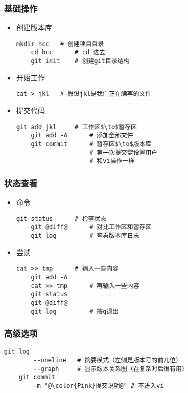 \begin{frame} [fragile]
	\frametitle{基础操作}
	\linespread{1.25}
	\begin{itemize}
	\item 创建版本库
	\begin{lstlisting}[style=bashstyle, gobble=4, texcl]
	mkdir hcc	# 创建项目目录
	cd hcc		# cd 进去
	git init	# 创建git目录结构
	\end{lstlisting}
	\item 开始工作
	\begin{lstlisting}[style=bashstyle, gobble=4, texcl]
	cat > jkl	# 假设jkl是我们正在编写的文件
	\end{lstlisting}
	\item 提交代码
	\begin{lstlisting}[style=bashstyle, gobble=4, texcl]
	git add jkl		# 工作区$\to$暂存区
	git add -A		# 添加全部文件
	git commit		# 暂存区$\to$版本库
					# 第一次提交需设置用户
					# 和vi操作一样
	\end{lstlisting}
	\end{itemize}
\end{frame}

\begin{frame} [fragile]
	\frametitle{状态查看}
	\linespread{1.25}
	\begin{itemize}
	\item 命令
	\begin{lstlisting}[style=bashstyle, gobble=4, texcl, escapechar=@]
	git status		# 检查状态
	git @diff@		# 对比工作区和暂存区
	git log			# 查看版本库日志
	\end{lstlisting}
	\item 尝试
	\begin{lstlisting}[style=bashstyle, gobble=4, texcl, escapechar=@]
	cat >> tmp		# 输入一些内容
	git add -A
	cat >> tmp		# 再输入一些内容
	git status
	git @diff@
	git log			# 按q退出
	\end{lstlisting}
	\end{itemize}
\end{frame}

\begin{frame} [fragile]
	\frametitle{高级选项}
	\linespread{1.5}
	\begin{lstlisting}[style=bashstyle, gobble=4, texcl, escapechar=@]
	git log
		--oneline	# 摘要模式（左侧是版本号的前几位）
		--graph		# 显示版本关系图（在复杂时后很有用）
	git commit
		-m "@\color{Pink}提交说明@"	# 不进入vi
	\end{lstlisting}
\end{frame}

